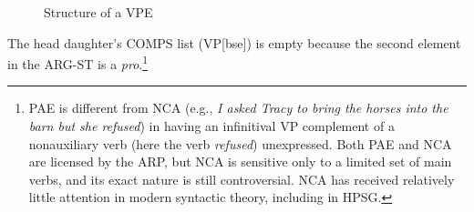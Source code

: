 {\begin{figure}
\caption{Structure of a VPE}\label{fig-53}
\end{figure}
%
The head daughter's COMPS list (VP[bse]) is empty because the second element in the ARG-ST
is a \textit{pro}.\footnote{PAE is different from NCA (e.g., \textit{I asked Tracy to bring the horses into the barn but she refused}) in having an infinitival VP complement of
a nonauxiliary verb (here the verb \textit{refused}) unexpressed. Both PAE and NCA are licensed by the ARP, but  NCA %
is sensitive only to a limited set of main verbs, and its exact nature is still controversial. NCA has received relatively little attention in modern syntactic theory, including in HPSG.}


}

